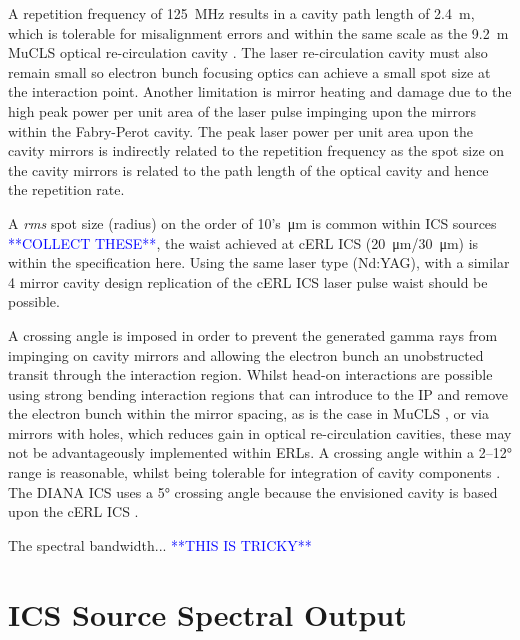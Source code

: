 \documentclass[../main.tex]{subfiles}
\begin{document}
A repetition frequency of 125~\si{\mega\hertz} results in a cavity path length of 2.4~\si{\meter}, which is tolerable for misalignment errors and within the same scale as the 9.2~\si{\meter} MuCLS optical re-circulation cavity \cite{eggl2016munich}. The laser re-circulation cavity must also remain small so electron bunch focusing optics can achieve a small spot size at the interaction point. Another limitation is mirror heating and damage due to the high peak power per unit area of the laser pulse impinging upon the mirrors within the Fabry-Perot cavity. The peak laser power per unit area upon the cavity mirrors is indirectly related to the repetition frequency as the spot size on the cavity mirrors is related to the path length of the optical cavity and hence the repetition rate.

A \textit{rms} spot size (radius) on the order of 10's~\si{\micro\meter} is common within ICS sources \cite{} \textcolor{blue}{**COLLECT THESE**}, the waist achieved at cERL ICS (20~\si{\micro\meter}/30~\si{\micro\meter}) \cite{akagi2016narrow} is within the specification here. Using the same laser type (Nd:YAG), with a similar 4 mirror cavity design replication of the cERL ICS laser pulse waist should be possible.


A crossing angle is imposed in order to prevent the generated gamma rays from impinging on cavity mirrors and allowing the electron bunch an unobstructed transit through the interaction region. Whilst head-on interactions are possible using strong bending interaction regions that can introduce to the IP and remove the electron bunch within the mirror spacing, as is the case in MuCLS \cite{eggl2016munich}, or via mirrors with holes, which reduces gain in optical re-circulation cavities, these may not be advantageously implemented within ERLs. A crossing angle within a 2--12\si{\degree} range is reasonable, whilst being tolerable for integration of cavity components \cite{variola2011luminosity}. The DIANA ICS uses a 5\si{\degree} crossing angle because the envisioned cavity is based upon the cERL ICS \cite{akagi2016narrow}. 

The spectral bandwidth... \textcolor{blue}{**THIS IS TRICKY**}

\section{ICS Source Spectral Output}
\end{document}

